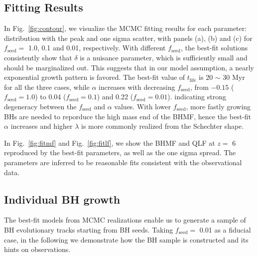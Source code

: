 \documentclass[nolinenumbers,preprint2,tighten]{aastex631}
\newcommand{\tlife}{t_\mathrm{life}}
\newcommand{\fseed}{f_\mathrm{seed}}
\begin{document}
\begin{CJK*}{UTF8}{gbsn}
\vspace{2mm}
\subsection{Fitting Results}\label{sec:fitting_result}
In Fig.~\ref{fig:contour}, we visualize the MCMC fitting results for each parameter: distribution with the peak and one sigma scatter, 
with panels (a), (b) and (c) for $\fseed=$ 1.0, 0.1 and 0.01, respectively. 
With different $\fseed$, the best-fit solutions consistently show that $\delta$ is a nuisance parameter, 
which is sufficiently small and should be marginalized out. This suggests that in our model assumption, 
a nearly exponential growth pattern is favored. 
The best-fit value of $\tlife$ is 20 $\sim$ 30 Myr for all the three cases, 
while $\alpha$ increases with decreasing $\fseed$, from $-0.15$ ($\fseed=1.0$) to 0.04 ($\fseed=0.1$) and 0.22 ($\fseed=0.01$).
indicating strong degeneracy between the $\fseed$ and $\alpha$ values. 
With lower $\fseed$, more fastly growing BHs are needed to reporduce the high mass end of the BHMF, hence the best-fit 
$\alpha$ increases and higher $\lambda$ is more commonly realized from the Schechter shape. 

In Fig.~\ref{fig:fitmf} and Fig.~\ref{fig:fitlf}, we show the BHMF and QLF at $z=$ 6 reproduced by the best-fit parameters, 
as well as the one sigma spread.
The parameters are inferred to be reasonable fits consistent with the observational data.

\vspace{2mm}
\subsection{Individual BH growth}\label{sec:evol}
The best-fit models from MCMC realizations enable us to generate a sample of BH evolutionary tracks starting from BH seeds.
Taking $\fseed=$ 0.01 as a fiducial case, in the following we demonstrate how the BH sample is constructed and its hints on observations.


\end{CJK*}
\end{document}

